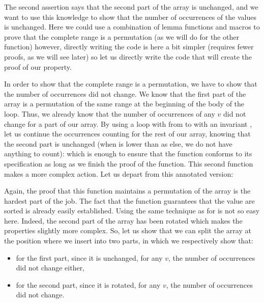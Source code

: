 The second assertion says that the second part of the array is unchanged, and we
want to use this knowledge to show that the number of occurrences of the values
is unchanged. Here we could use a combination of lemma functions and macros to
prove that the complete range is a permutation (as we will do for the other
function) however, directly writing the code is here a bit simpler (requires
fewer proofs, as we will see later) so let us directly write the code that will
create the proof of our property.



In order to show that the complete range is a permutation, we have to show that
the number of occurrences did not change. We know that the first part of the
array is a permutation of the same range at the beginning of the body of the loop.
Thus, we already know that the number of occurrences of any $v$ did not change
for a part of our array. By using a loop with  from 
to  with an invariant ,
let us continue the occurrences counting for the rest of our array, knowing that
the second part is unchanged (when  is lower than 
as else, we do not have anything to count):
which is enough to ensure that the  function
conforms to its specification as long as we finish the proof of the
 function. This second function makes a more complex action.
Let us depart from this annotated version:




Again, the proof that this function maintains a permutation of the array is
the hardest part of the job. The fact that the function guarantees that the
value are sorted is already easily established. Using the same technique as
for  is not so easy here. Indeed, the second part
of the array has been rotated which makes the properties slightly more
complex. So, let us show that we can split the array at the position where
we insert into two parts, in which we respectively show that:
\begin{itemize}
\item for the first part, since it is unchanged, for any $v$, the number of
  occurrences did not change either,
\item for the second part, since it is rotated, for any $v$, the number of
  occurrences did not change.
\end{itemize}

